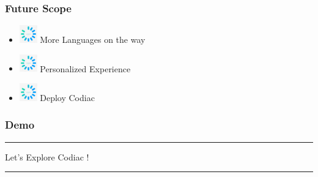 \documentclass[14pt]{beamer}
\begin{document}
\begin{frame}
    \frametitle{Future Scope}
	\noindent                                                                                                       {\color{pink} \rule{\linewidth}{0.7mm}} 
         \begin{itemize}
 \item [] \includegraphics[width=0.3in, height=0.3in]{./logos/loading.jpg} More Languages on the way\\
     \pause
 \item [] \includegraphics[width=0.3in, height=0.3in]{./logos/loading.jpg} Personalized Experience \\
     \pause
 \item [] \includegraphics[width=0.3in, height=0.3in]{./logos/loading.jpg} Deploy Codiac\\
 \end{itemize}
\noindent{	
	   \color{pink} \rule{\linewidth}{0.7mm} }   	
\end{frame}	


\begin{frame}
	\frametitle{Demo}
    {\color{dr} \rule{\linewidth}{0.7mm}}
    \linebreak
    \linebreak
    \centerline
    {\huge \color{dr}
   Let's Explore Codiac !}
    \linebreak

    {\color{dr} \rule{\linewidth}{0.7mm}}
\end{frame}
\end{document}
